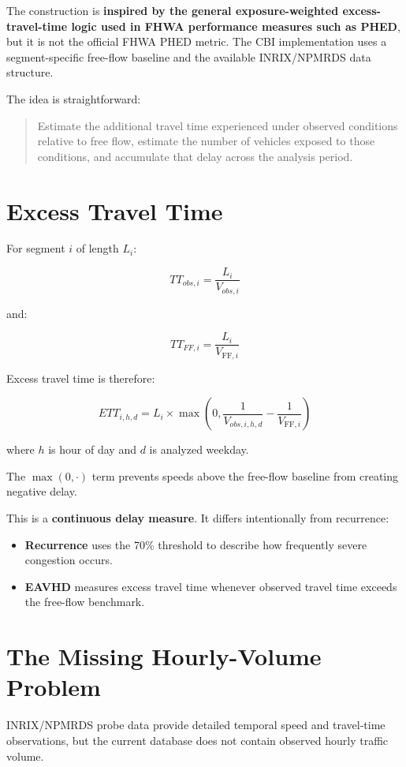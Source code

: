 \documentclass[11pt]{article}
\begin{document}
The construction is \textbf{inspired by the general exposure-weighted excess-travel-time logic used in FHWA performance measures such as PHED}, but it is not the official FHWA PHED metric. The CBI implementation uses a segment-specific free-flow baseline and the available INRIX/NPMRDS data structure.

The idea is straightforward:

\begin{quote}
Estimate the additional travel time experienced under observed conditions relative to free flow, estimate the number of vehicles exposed to those conditions, and accumulate that delay across the analysis period.
\end{quote}

\section{Excess Travel Time}

For segment $i$ of length $L_i$:

\[
TT_{obs,i} = \frac{L_i}{V_{obs,i}}
\]

and:

\[
TT_{FF,i} = \frac{L_i}{V_{\mathrm{FF},i}}
\]

Excess travel time is therefore:

\[
\boxed{
ETT_{i,h,d} = L_i \times \max\left(0,\frac{1}{V_{obs,i,h,d}} - \frac{1}{V_{\mathrm{FF},i}}\right)
}
\]

where $h$ is hour of day and $d$ is analyzed weekday.

The $\max(0,\cdot)$ term prevents speeds above the free-flow baseline from creating negative delay.

This is a \textbf{continuous delay measure}. It differs intentionally from recurrence:

\begin{itemize}
    \item \textbf{Recurrence} uses the 70\% threshold to describe how frequently severe congestion occurs.
    \item \textbf{EAVHD} measures excess travel time whenever observed travel time exceeds the free-flow benchmark.
\end{itemize}

\section{The Missing Hourly-Volume Problem}

INRIX/NPMRDS probe data provide detailed temporal speed and travel-time observations, but the current database does not contain observed hourly traffic volume.
\end{document}

